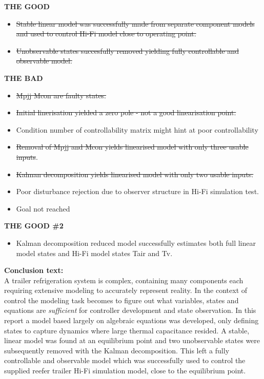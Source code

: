 \textbf{THE GOOD}

\begin{itemize}
	\item \sout{Stable linear model was successfully made from separate component models and used to control Hi-Fi model close to operating point.}
	\item \sout{Unobservable states succesfully removed yielding fully controllable and observable model.}
\end{itemize}

\noindent \textbf{THE BAD}

\begin{itemize}
	\item \sout{Mpjj Mcon are faulty states.}
	\item \sout{Initial linerisation yielded a zero pole - not a good linearisation point.}
	\item Condition number of controllability matrix might hint at poor controllability
	\item \sout{Removal of Mpjj and Mcon yields linearised model with only three usable inputs}.
	\item \sout{Kalman decomposition yields linearised model with only two usable inputs.}
	\item Poor disturbance rejection due to observer structure in Hi-Fi simulation test.
	\item Goal not reached
\end{itemize}

\noindent \textbf{THE GOOD \#2}

\begin{itemize}
	\item Kalman decomposition reduced model successfully estimates both full linear model states and Hi-Fi model states Tair and Tv.
\end{itemize}

\textbf{Conclusion text:} \\
A trailer refrigeration system is complex, containing many components each requiring extensive modeling to accurately represent reality. In the context of control the modeling task becomes to figure out what variables, states and equations are \textit{sufficient} for controller development and state observation. In this report a model based largely on algebraic equations was developed, only defining states to capture dynamics where large thermal capacitance resided. A stable, linear model was found at an equilibrium point and two unobservable states were subsequently removed with the Kalman decomposition. This left a fully controllable and observable model which was successfully used to control the supplied reefer trailer Hi-Fi simulation model, close to the equilibrium point.

